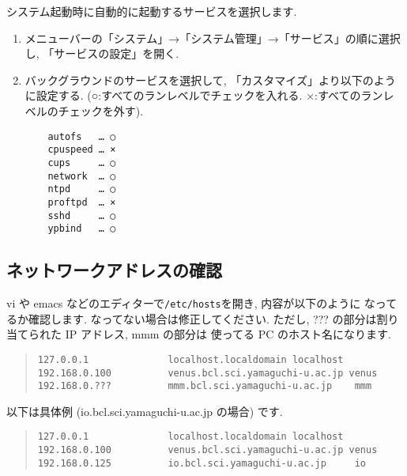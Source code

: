 \documentclass{jarticle}
\begin{document}
システム起動時に自動的に起動するサービスを選択します.
\begin{enumerate}
	\item メニューバーの「システム」→「システム管理」→「サービス」の順に選択し,
	      「サービスの設定」を開く.
	\item バックグラウンドのサービスを選択して, 「カスタマイズ」より以下のように設定する.
	      (○:すべてのランレベルでチェックを入れる. ×:すべてのランレベルのチェックを外す).

\begin{verbatim}
    autofs   … ○
    cpuspeed … ×
    cups     … ○
    network  … ○
    ntpd     … ○
    proftpd  … ×
    sshd     … ○
    ypbind   … ○
\end{verbatim}


\end{enumerate}



\subsection{ネットワークアドレスの確認}

vi や emacs などのエディターで\verb|/etc/hosts|を開き, 内容が以下のように
なってるか確認します. なってない場合は修正してください.
ただし, ??? の部分は割り当てられた IP アドレス, mmm の部分は
使ってる PC のホスト名になります.
\begin{quote}
\begin{verbatim}
127.0.0.1              localhost.localdomain localhost
192.168.0.100          venus.bcl.sci.yamaguchi-u.ac.jp venus
192.168.0.???          mmm.bcl.sci.yamaguchi-u.ac.jp    mmm
\end{verbatim}
\end{quote}
以下は具体例 (io.bcl.sci.yamaguchi-u.ac.jp の場合) です.
\begin{quote}
\begin{verbatim}
127.0.0.1              localhost.localdomain localhost
192.168.0.100          venus.bcl.sci.yamaguchi-u.ac.jp venus
192.168.0.125          io.bcl.sci.yamaguchi-u.ac.jp     io
\end{verbatim}
\end{quote}
\end{document}
